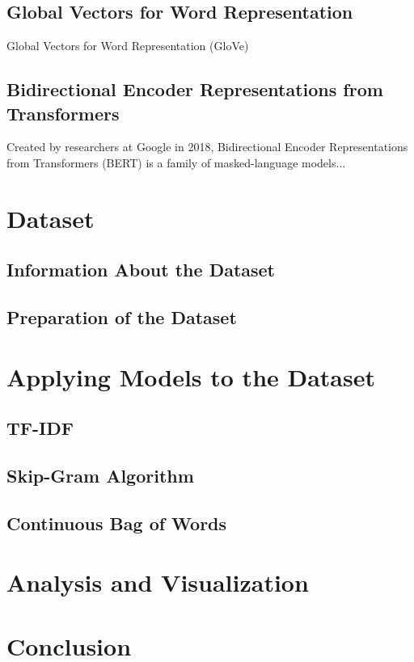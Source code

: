 \documentclass[man]{apa7}
\begin{document}
\subsection{Global Vectors for Word Representation}
Global Vectors for Word Representation (GloVe)
\subsection{Bidirectional Encoder Representations from Transformers}
Created by researchers at Google in 2018, Bidirectional Encoder Representations from Transformers (BERT) is a family of masked-language models...
\section{Dataset}
\lipsum[0-1]
\subsection{Information About the Dataset}
\lipsum[0-1]
\subsection{Preparation of the Dataset}
\lipsum[0-1]
\section{Applying Models to the Dataset}
\lipsum[0-1]
\subsection{TF-IDF}
\lipsum[0-1]
\subsection{Skip-Gram Algorithm}
\lipsum[0-1]
\subsection{Continuous Bag of Words}
\lipsum[0-1]
\section{Analysis and Visualization}
\section{Conclusion}
\lipsum[0-1]
\end{document}
